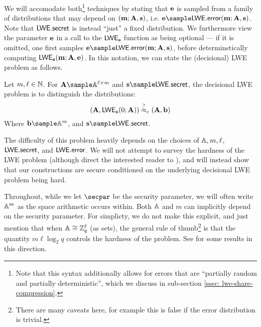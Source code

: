We will accomodate both\footnote{Note that this syntax additionally allows for errors that are ``partially random and partially deterministic'', which we discuss in sub-section \ref{ssec: lwe-share-compression}.} techniques by stating that $\mathbf{e}$ is sampled from a family of distributions that may depend on $(\mathbf{m}; \mathbf{A}, \mathbf{s})$, i.e. $\vfont{e} \sample \LWE.\error(\vfont{m};\mfont{A}, \vfont{s})$.
Note that $\mathsf{LWE}.\mathsf{secret}$ is instead ``just'' a fixed distribution.
We furthermore view the parameter $\mathbf{e}$ in a call to the $\mathsf{LWE}_{\mathbf{s}}$ function as being optional --- if it is omitted, one first samples $\vfont{e}\sample \LWE.\error(\vfont{m}; \mfont{A}, \vfont{s})$, before determinstically computing $\mathsf{LWE}_{\mathbf{s}}(\mathbf{m}; \mathbf{A}, \mathbf{e})$.
In this notation, we can state the (decisional) LWE problem as follows.
\begin{definition}
	Let $m, \ell\in\mathbb{N}$.
	For $\mfont{A}\sample \Aset^{\ell\times m}$ and $\vfont{s}\sample \LWE.\secret$, the decisional LWE problem is to distinguish the distributions:
	\begin{equation*}
	(\mathbf{A}, \mathsf{LWE}_{\mathbf{s}}(0;\mathbf{A}))\stackrel{?}{\approx}_c (\mathbf{A}, \mathbf{b})
	\end{equation*}	
	Where $\vfont{b}\sample \Aset^m$, and $\vfont{s}\sample\LWE.\secret$.
\end{definition}

The difficulty of this problem heavily depends on the choices of $\mathbb{A}, m, \ell$, $\mathsf{LWE}.\mathsf{secret}$, and $\mathsf{LWE}.\mathsf{error}$.
We will not attempt to survey the hardness of the LWE problem (although direct the interested reader to \cite{albrecht2015concrete}), and will instead show that our constructions are secure conditioned on the underlying decisional LWE problem being hard.

Throughout, while we let $\secpar$ be the security parameter, we will often write $\mathbb{A}^m$ as the space arithmetic occurs within.
Both $\mathbb{A}$ and $m$ can implicitly depend on the security parameter.
For simplicty, we do not make this explicit, and just mention that when $\mathbb{A}\cong \mathbb{Z}_q^\ell$ (as sets), the general rule of thumb\footnote{There are many caveats here, for example this is false if the error distribution is trivial.} is that the quantity $m\ell\log_2 q$ controls the hardness of the problem.
See \cite{EPRINT:BraDot20a} for some results in this direction.

